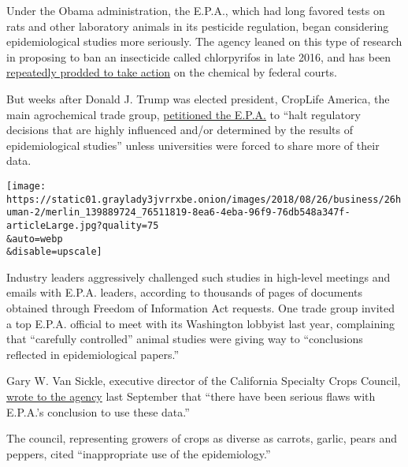 Under the Obama administration, the E.P.A., which had long favored tests
on rats and other laboratory animals in its pesticide regulation, began
considering epidemiological studies more seriously. The agency leaned on
this type of research in proposing to ban an insecticide called
chlorpyrifos in late 2016, and has been
\href{https://www.nytimes3xbfgragh.onion/2018/08/09/us/politics/chlorpyrifos-pesticide-ban-epa-court.html?rref=collection\%2Fbyline\%2Feric-lipton\&action=click\&contentCollection=undefined\&region=stream\&module=stream_unit\&version=latest\&contentPlacement=1\&pgtype=collection}{repeatedly
prodded to take action} on the chemical by federal courts.

But weeks after Donald J. Trump was elected president, CropLife America,
the main agrochemical trade group,
\href{http://www.croplifeamerica.org/news/2017/10/26/cla-petitions-epa-to-stop-using-studies-that-are-not-backed-by-sound-science-or-quality-data}{petitioned
the E.P.A.} to ``halt regulatory decisions that are highly influenced
and/or determined by the results of epidemiological studies'' unless
universities were forced to share more of their data.

\texttt{[image: https://static01.graylady3jvrrxbe.onion/images/2018/08/26/business/26human-2/merlin\_139889724\_76511819-8ea6-4eba-96f9-76db548a347f-articleLarge.jpg?quality=75\\\&auto=webp\\\&disable=upscale]}

Industry leaders aggressively challenged such studies in high-level
meetings and emails with E.P.A. leaders, according to thousands of pages
of documents obtained through Freedom of Information Act requests. One
trade group invited a top E.P.A. official to meet with its Washington
lobbyist last year, complaining that ``carefully controlled'' animal
studies were giving way to ``conclusions reflected in epidemiological
papers.''

Gary W. Van Sickle, executive director of the California Specialty Crops
Council,
\href{https://www.documentcloud.org/documents/4639868-2017-9-21-California-Speciality-Crops-Council.html}{wrote
to the agency} last September that ``there have been serious flaws with
E.P.A.'s conclusion to use these data.''

The council, representing growers of crops as diverse as carrots,
garlic, pears and peppers, cited ``inappropriate use of the
epidemiology.''

